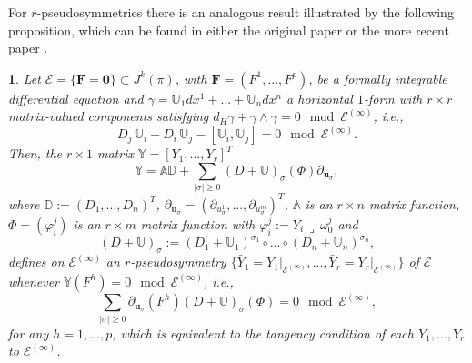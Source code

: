 \documentclass[12pt,english]{elsarticle}
\theoremstyle{plain}
\theoremstyle{plain}
\newtheorem{prop}[thm]{\protect\propositionname}
\theoremstyle{remark}
\theoremstyle{plain}
\theoremstyle{definition}
\theoremstyle{definition}
\providecommand{\propositionname}{Proposition}
\begin{document}
For $r$-pseudosymmetries there is an analogous result illustrated by the
following proposition, which can be found in either the original paper
\cite{Sokolov} or the more recent paper \cite{Chet}.
%
\begin{prop}
\label{prop:pseudoE-1}%
Let $\mathcal{E}=\{\mathbf{F=0}\}\subset J^{k}(\pi )$, with
$\text{$\mathbf{F}$}=(F^{1},...,F^{p})$, be a formally integrable
differential equation and
$\gamma =\mathbb{U}_{1}dx^{1}+...+\mathbb{U}_{n}dx^{n}$ a horizontal
$1$-form with $r\times r$ matrix-valued components satisfying
$d_{H}\gamma +\gamma \wedge \gamma =0\mod{\mathcal{E}^{(\infty )}}$, i.e.,
%
\begin{equation}
D_{j}\,\mathbb{U}_{i}-D_{i}\,\mathbb{U}_{j}-[\mathbb{U}_{i},\mathbb{U}_{j}]=0
\mod{\mathcal{E}^{(\infty )}}.
\label{eq:U_psym-1}
\end{equation}
%
Then, the $r\times 1$ matrix
$\mathbb{Y}=\left [Y_{1},...,Y_{r}\right ]^{T}$
%
\begin{equation}
\mathbb{Y}=\mathbb{A}\mathbb{D}+\sum _{|\sigma |\geq 0}
\left (D+\mathbb{U}\right )_{\sigma}(\Phi )\partial _{\mathbf{u}_{
\sigma}},
\label{eq:Y_pseudo_int-1}
\end{equation}
%
where $\mathbb{D}:=(D_{1},...,D_{n})^{T}$,
$\partial _{\mathbf{u}_{\sigma}}=(\partial _{u_{\sigma}^{1}},...,
\partial _{u_{\sigma}^{m}})^{T}$, $\mathbb{A}$ is an $r\times n$ matrix
function, $\Phi =(\varphi _{i}^{j})$ is an $r\times m$ matrix function
with $\varphi _{i}^{j}:=Y_{i}\,\lrcorner \,\omega _{0}^{j}$ and
%
\begin{equation*}
\left (D+\mathbb{U}\right )_{\sigma}:=\left (D_{1}+\mathbb{U}_{1}\right )^{\sigma _{1}}
\circ ...\circ \left (D_{n}+\mathbb{U}_{n}\right )^{\sigma _{n}},
\end{equation*}
%
defines on $\mathcal{E}^{(\infty )}$ an $r$-pseudosymmetry
$\{\bar{Y}_{1}=\left .Y_{1}\right |_{\mathcal{E}^{(\infty )}},...,
\bar{Y}_{r}=\left .Y_{r}\right |_{\mathcal{E}^{(\infty )}}\}$ of
$\mathcal{E}$ whenever
$\mathbb{Y}(F^{h})=0\mod{\mathcal{E}^{(\infty )}}$, i.e.,
%
\begin{equation}
\sum _{|\sigma |\geq 0}\partial _{\mathbf{u}_{\sigma}}\left (F^{h}
\right )\left (D+\mathbb{U}\right )_{\sigma}(\Phi )=0
\mod{\mathcal{E}^{(\infty )}},
\label{eq:Y_tang-1}
\end{equation}
%
for any $h=1,...,p$, which is equivalent to the tangency condition of each
$Y_{1},...,Y_{r}$ to $\mathcal{E}^{(\infty )}$.
\end{prop}
\end{document}

